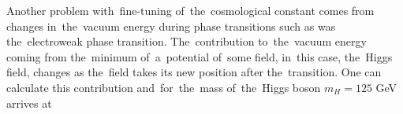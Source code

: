 \begin{sloppypar}
Another problem with~fine-tuning of~the~cosmological constant comes from changes in~the~vacuum energy during phase transitions such as was the~electroweak phase transition. The~contribution to~the~vacuum energy coming from the~minimum of~a~potential of~some field, in~this case, the~Higgs field, changes as the~field takes its new position after the~transition. One can calculate this contribution \parencite{2012CRPhy..13..566M} and~for~the~mass of~the~Higgs boson $m_H=125$ GeV arrives at
\end{sloppypar}
